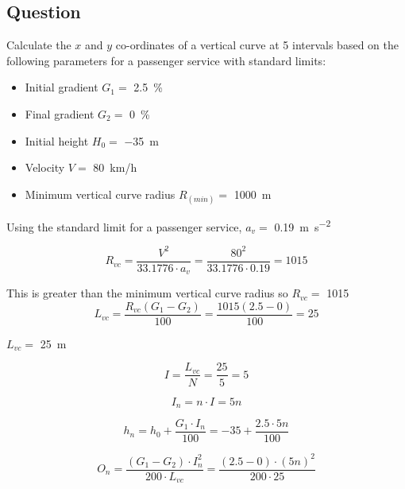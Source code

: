 \documentclass{bcrre_exam}
\begin{document}
\subsection*{Question}
\begin{questions}

\question
Calculate the $x$ and $y$ co-ordinates of a vertical curve at \num{5} intervals based on the following parameters for a passenger service with standard limits:
\begin{itemize}
    \item Initial gradient $G_1=$ \qty{2.5}{\percent}
    \item Final gradient $G_2=$ \qty{0}{\percent}
    \item Initial height $H_0=$ \qty{-35}{m}
    \item Velocity $V=$ \qty{80}{km/h}
    \item Minimum vertical curve radius $R_{(min)}=$ \qty{1000}{m}
\end{itemize}

\begin{solution}
Using the standard limit for a passenger service, $a_v=$ \qty{0.19}{\meter \per \second \squared}

\begin{equation}
    R_{vc}=\frac{V^2}{33.1776 \cdot a_v}=\frac{80^2}{33.1776 \cdot 0.19} = 1015
\end{equation}

This is greater than the minimum vertical curve radius so $R_{vc}=$ \qty{1015}.

\begin{equation}
    L_{vc} = \frac{R_{vc}(G_1-G_2)}{100}=\frac{1015(2.5-0)}{100}=25
\end{equation}

$L_{vc}=$ \qty{25}{m}

\begin{equation}
    I = \frac{L_{vc}}{N} = \frac{25}{5} = 5
\end{equation}

\begin{equation}
    I_n = n \cdot I = 5n
\end{equation}

\begin{equation}
    h_n = h_0 + \frac{G_1 \cdot I_n}{100}=-35+\frac{2.5 \cdot 5n}{100}
\end{equation}

\begin{equation}
    O_n = \frac{(G_1-G_2) \cdot I_n^2}{200 \cdot L_{vc}} = \frac{(2.5-0)\cdot (5n)^2}{200 \cdot 25}
\end{equation}


\end{solution}
\end{questions}
\end{document}
